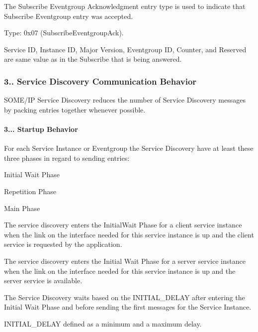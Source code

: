 \begin{DoxyItemize}
\item The Subscribe Eventgroup Acknowledgment entry type is used to indicate that Subscribe Eventgroup entry was accepted.
\item Type\+: 0x07 (Subscribe\+Eventgroup\+Ack).
\item Service ID, Instance ID, Major Version, Eventgroup ID, Counter, and Reserved are same value as in the Subscribe that is being answered. 
\end{DoxyItemize}

\subsubsection*{3.. Service Discovery Communication Behavior}


\begin{DoxyItemize}
\item S\+O\+M\+E/\+IP Service Discovery reduces the number of Service Discovery messages by packing entries together whenever possible.
\end{DoxyItemize}

\paragraph*{3... Startup Behavior}


\begin{DoxyItemize}
\item For each Service Instance or Eventgroup the Service Discovery have at least these three phases in regard to sending entries\+:
\begin{DoxyItemize}
\item Initial Wait Phase
\item Repetition Phase
\item Main Phase
\end{DoxyItemize}
\item The service discovery enters the Initial\+Wait Phase for a client service instance when the link on the interface needed for this service instance is up and the client service is requested by the application.
\item The service discovery enters the Initial Wait Phase for a server service instance when the link on the interface needed for this service instance is up and the server service is available.
\item The Service Discovery waits based on the I\+N\+I\+T\+I\+A\+L\+\_\+\+D\+E\+L\+AY after entering the Initial Wait Phase and before sending the first messages for the Service Instance.
\item I\+N\+I\+T\+I\+A\+L\+\_\+\+D\+E\+L\+AY defined as a minimum and a maximum delay.
\end{DoxyItemize}


